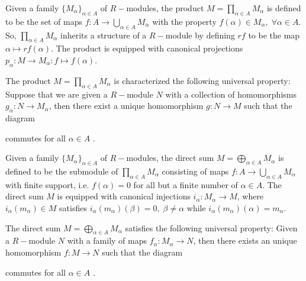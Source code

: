\begin{dang}
    \begin{definition}\cite{jacobsonbasic}
         Given a family $\{M_\alpha\}_{\alpha\in A}$ of $R-$modules, the product $M=\prod_{\alpha\in A}M_\alpha$ is defined to be the set of maps $f: A\rightarrow\bigcup_{\alpha\in A}M_\alpha$ with the property $f(\alpha)\in M_\alpha,\;\forall\alpha\in A$. So, $\prod_{\alpha\in A}M_\alpha$ inherits a structure of a $R-$module by defining $rf$ to be the map $\alpha\mapsto rf(\alpha)$. The product is equipped with canonical projections $p_\alpha: M\rightarrow M_\alpha: f\mapsto f(\alpha)$.
    \end{definition}
\end{dang}
The product $M=\prod_{\alpha\in A}M_\alpha$ is characterized the following universal property: Suppose that we are given a $R-$module $N$ with a collection of homomorphisms $g_\alpha: N\rightarrow M_\alpha$, then there exist a unique homomorphism $g: N\rightarrow M$ such that the diagram
\begin{center}
\end{center}
commutes for all $\alpha\in A$ \cite{jacobsonbasic}.

\begin{dang}
    \begin{definition} \cite{jacobsonbasic}  
        Given a family $\{M_\alpha\}_{\alpha\in A}$ of $R-$modules, the direct sum $M=\bigoplus_{\alpha\in A} M_\alpha$ is defined to be the submodule of $\prod_{\alpha\in A}M_\alpha$ consisting of maps $f: A\rightarrow \bigcup_{\alpha\in A}M_\alpha$ with finite support, i.e. $f(\alpha)=0$ for all but a finite number of $\alpha \in A$. The direct sum $M$ is equipped with canonical injections $i_\alpha: M_\alpha\rightarrow M$, where $i_\alpha(m_\alpha)\in M$ satisfies $i_\alpha(m_\alpha)(\beta)=0,\;\beta\neq\alpha$ while $i_\alpha(m_\alpha)(\alpha)=m_\alpha$.
    \end{definition}
\end{dang}
The direct sum $M=\bigoplus_{\alpha\in A}M_\alpha$ satisfies the following universal property: Given a $R-$module $N$ with a family of maps $f_\alpha: M_\alpha\rightarrow N$, then there exists an unique homomorphism $f: M\rightarrow N$ such that the diagram
\begin{center}
\end{center}
commutes for all $\alpha\in A$ \cite{jacobsonbasic}. 


